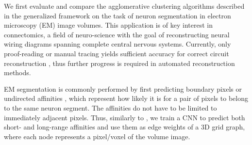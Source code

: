 We first evaluate and compare the agglomerative clustering algorithms described in the generalized framework on the task of neuron segmentation in electron microscopy (EM) image volumes. This application is of key interest in connectomics, a field of neuro-science with the goal of reconstructing neural wiring diagrams spanning complete central nervous systems. Currently, only proof-reading or manual tracing yields sufficient accuracy for correct circuit reconstruction \cite{schlegel2017learning}, thus further progress is required in automated reconstruction methods.

EM segmentation is commonly performed by first predicting 
boundary pixels \cite{beier2017multicut,ciresan2012deep} or undirected affinities \cite{wolf2018mutex,lee2017superhuman,funke2018large}, which represent how likely it is for a pair of pixels to belong to the same neuron segment. 
The affinities do not have to be limited to immediately adjacent pixels.
Thus, similarly to \cite{lee2017superhuman}, we train a CNN to predict both short- and long-range affinities
and use them as edge weights of a 3D grid graph, where each node represents a pixel/voxel of the volume image. 
